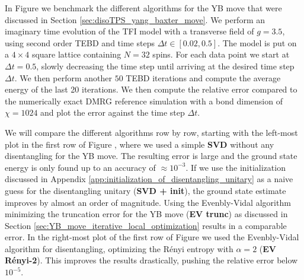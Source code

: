 In Figure  we benchmark the different algorithms for the YB move that were discussed in Section \ref{sec:disoTPS_yang_baxter_move}. We perform an imaginary time evolution of the TFI model with a transverse field of $g = 3.5$, using second order TEBD and time steps $\Delta t \in \left[0.02, 0.5\right]$. The model is put on a $4\times4$ square lattice containing $N = 32$ spins. For each data point we start at $\Delta t = 0.5$, slowly decreasing the time step until arriving at the desired time step $\Delta t$. We then perform another $50$ TEBD iterations and compute the average energy of the last 20 iterations. We then compute the relative error compared to the numerically exact DMRG reference simulation with a bond dimension of $\chi = 1024$ and plot the error against the time step $\Delta t$. \par
%

%

%
We will compare the different algorithms row by row, starting with the left-most plot in the first row of Figure , where we used a simple \textbf{SVD} without any disentangling for the YB move. The resulting error is large and the ground state energy is only found up to an accuracy of $\approx10^{-3}$. If we use the initialization discussed in Appendix \ref{app:initialization_of_disentangling_unitary} as a naive guess for the disentangling unitary (\textbf{SVD + init}), the ground state estimate improves by almost an order of magnitude. Using the Evenbly-Vidal algorithm minimizing the truncation error for the YB move (\textbf{EV trunc}) as discussed in Section \ref{sec:YB_move_iterative_local_optimization} results in a comparable error. In the right-most plot of the first row of Figure  we used the Evenbly-Vidal algorithm for disentangling, optimizing the Rényi entropy with $\alpha = 2$ (\textbf{EV Rényi-2}). This improves the results drastically, pushing the relative error below $10^{-5}$. \par
